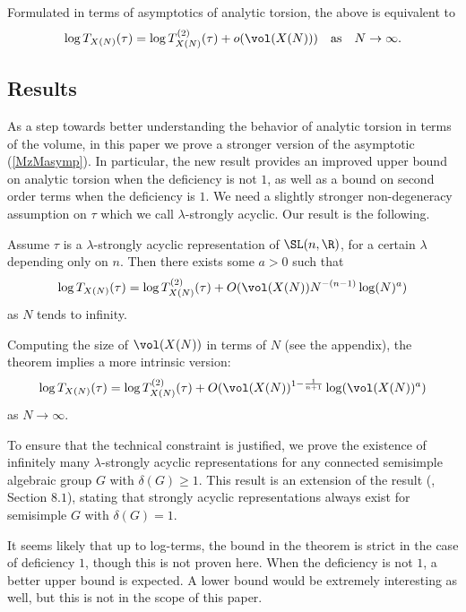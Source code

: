 \noindent Formulated in terms of asymptotics of analytic torsion, the above is equivalent to
\begin{align}\label{MzMasymp}
    \log T_{X(N)}(\tau)=\log T^{(2)}_{X(N)}(\tau)+o(\vol(X(N))) \quad\text{as}\quad N\to\infty.
\end{align}

\subsection{Results} 

As a step towards better understanding the behavior of analytic torsion in terms of the volume, in this paper we prove a stronger version of the asymptotic (\ref{MzMasymp}). In particular, the new result provides an improved upper bound on analytic torsion when the deficiency is not $1$, as well as a bound on second order terms when the deficiency is $1$. We need a slightly stronger non-degeneracy assumption on $\tau$ which we call $\lambda$-strongly acyclic. Our result is the following.
\begin{thm}\label{mytheorem}
    Assume $\tau$ is a $\lambda$-strongly acyclic representation of $\SL(n,\R)$, for a certain $\lambda$ depending only on $n$. Then there exists some $a>0$ such that
    $$\log T_{X(N)}(\tau) = \log T_{X(N)}^{(2)}(\tau)+O(\vol(X(N))N^{-(n-1)}\log(N)^a)$$
    as $N$ tends to infinity.
\end{thm}

\noindent Computing the size of $\vol(X(N))$ in terms of $N$ (see the appendix), the theorem implies a more intrinsic version:
\begin{align}\label{mytheoreminvar}
    \log T_{X(N)}(\tau) = \log T_{X(N)}^{(2)}(\tau)+O(\vol(X(N))^{1-\frac{1}{n+1}}\log(\vol(X(N))^a)
\end{align}
\noindent as $N\to\infty$.

\noindent To ensure that the technical constraint is justified, we prove the existence of infinitely many $\lambda$-strongly acyclic representations for any connected semisimple algebraic group $G$ with $\delta(G)\geq 1$. This result is an extension of the result (\cite{BV}, Section $8.1$), stating that strongly acyclic representations always exist for semisimple $G$ with $\delta(G)=1$.

It seems likely that up to log-terms, the bound in the theorem is strict in the case of deficiency $1$, though this is not proven here. When the deficiency is not $1$, a better upper bound is expected. A lower bound would be extremely interesting as well, but this is not in the scope of this paper.

